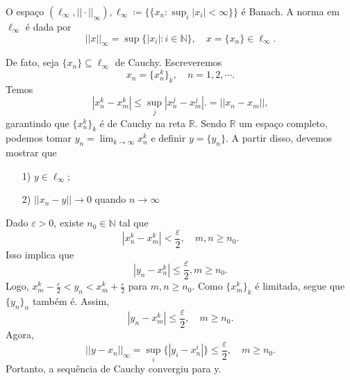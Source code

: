 \documentclass[metric_notes.tex]{subfiles}
\begin{document}
\begin{example}
	O espaço \((\ell_{\infty}, ||\cdot ||_{\infty}), \ell_{\infty}\coloneqq \biggl\{\{x_{n}:\sup_{i}|x_{i}|<\infty\}\biggr\}\) é Banach. A norma em \(\ell_{\infty}\) é dada por
	\[
		||x||_{\infty}=\sup\{|x_{i}|:i\in \mathbb{N}\},\quad x = \{x_{n}\}\in \ell_{\infty}.
	\]

	De fato, seja \(\{x_{n}\}\subseteq{\ell_{\infty}}\) de Cauchy. Escreveremos
	\[
		x_{n} = \{x_{n}^{k}\}_{k}, \quad n = 1, 2, \cdots.
	\]
	Temos
	\[
		|x_{n}^{k}-x_{m}^{k}|\leq \sup_{j}|x_{n}^{j}-x_{m}^{j} |. = ||x_{n}-x_{m}||,
	\]
	garantindo que \(\{x_{n}^{k}\}_{k}\) é de Cauchy na reta \(\mathbb{R}\). Sendo \(\mathbb{R}\) um espaço completo, podemos tomar
	\(y_{n} = \lim_{k\to \infty}x_{n}^{k}\) e definir \(y = \{y_{n}\}\). A partir disso, devemos mostrar que
	\begin{itemize}
		\item[1)] \(y\in \ell_{\infty}\);
		\item[2)] \(||x_{n}-y||\longrightarrow 0\) quando \(n\longrightarrow\infty\)
	\end{itemize}
	Dado \(\varepsilon > 0\), existe \(n_{0}\in \mathbb{N}\) tal que
	\[
		|x_{n}^{k}-x_{m}^{k}| < \frac{\varepsilon }{2},\quad m,n\geq n_{0}.
	\]
	Isso implica que
	\[
		|y_{n}-x_{n}^{k}|\leq \frac{\varepsilon }{2}, m\geq n_{0}.
	\]
	Logo, \(x_{m}^{k}-\frac{\varepsilon }{2} < y_{n} < x_{m}^{k}+\frac{\varepsilon }{2}\) para \(m, n\geq n_{0}.\) Como
	\(\{x_{m}^{k}\}_{k}\) é limitada, segue que \(\{y_{n}\}_{n}\) também é. Assim,
	\[
		|y_{n}-x_{m}^{k}|\leq \frac{\varepsilon }{2},\quad m\geq n_{0}.
	\]
	Agora,
	\[
		||y-x_{n}||_{\infty}=\sup_{i}\{|y_{i}-x_{n}^{i}|\}\leq \frac{\varepsilon }{2},\quad m\geq n_{0}.
	\]
	Portanto, a sequência de Cauchy convergiu para y.
\end{example}
\end{document}
